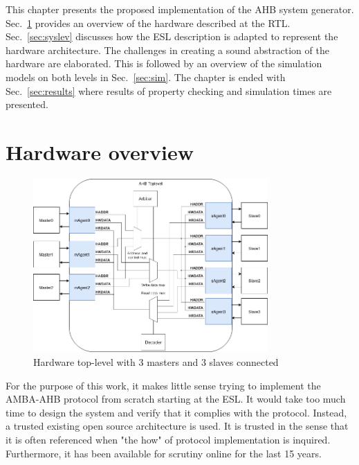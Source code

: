 \label{ch:impl}
This chapter presents the proposed implementation of the AHB system generator. Sec.~\ref{sec:hardover} provides an overview of the hardware described at the RTL. Sec.~\ref{sec:syslev} discusses how the ESL description is adapted to represent the hardware architecture. The challenges in creating a sound abstraction
of the hardware are elaborated. This is followed by an overview of the simulation models on both levels in Sec.~\ref{sec:sim}. The chapter is ended with Sec.~\ref{sec:results} where results of property checking and simulation times are presented.

\newpage
\section{Hardware overview}
\label{sec:hardover}
\begin{figure}[hbt]
    \begin{center}
        \includegraphics[width=0.8\textwidth]{figs/hw/Hw_toplevel.png}
    \end{center}
    \caption{Hardware top-level with 3 masters and 3 slaves connected}
    \label{fig:hw_toplev}
\end{figure}

For the purpose of this work, it makes little sense trying to implement the AMBA-AHB protocol from scratch starting at the ESL. It would take too much time to design the system and verify that it complies with the protocol. Instead, a trusted existing open source architecture is used. It is trusted in the sense that
it is often referenced when "the how" of protocol implementation is inquired. Furthermore, it has been available for scrutiny online for the last 15 years.  


